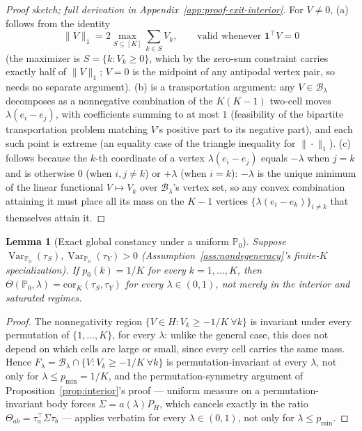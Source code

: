 \documentclass[11pt]{article}
\theoremstyle{plain}
\newtheorem{lemma}[theorem]{Lemma}
\theoremstyle{definition}
\theoremstyle{remark}
\newcommand{\PP}{\mathbb{P}}
\newcommand{\cB}{\mathcal{B}}
\newcommand{\Corr}{\mathrm{cor}}
\DeclareMathOperator{\Var}{Var}
\begin{document}
\begin{proof}[Proof sketch; full derivation in Appendix~\ref{app:proof-exit-interior}]
For $V\ne0$, (a) follows from the identity
\[
    \|V\|_1=2\max_{S\subseteq[K]}\sum_{k\in S}V_k, \qquad \text{valid whenever } \mathbf1^\top V=0
\]
(the maximizer is $S=\{k:V_k\ge0\}$, which by the zero-sum constraint carries
exactly half of $\|V\|_1$; $V=0$ is the midpoint of any antipodal vertex pair, so
needs no separate argument). (b) is a transportation argument: any $V\in\cB_\lambda$
decomposes as a nonnegative combination of the $K(K-1)$ two-cell moves
$\lambda(e_i-e_j)$, with coefficients summing to at most $1$ (feasibility of the
bipartite transportation problem matching $V$'s positive part to its negative
part), and each such point is extreme (an equality case of the triangle inequality
for $\|\cdot\|_1$). (c) follows because the $k$-th coordinate of a vertex
$\lambda(e_i-e_j)$ equals $-\lambda$ when $j=k$ and is otherwise $0$ (when
$i,j\ne k$) or $+\lambda$ (when $i=k$): $-\lambda$ is the unique minimum of the
linear functional $V\mapsto V_k$ over $\cB_\lambda$'s vertex set, so any convex
combination attaining it must place all its mass on the $K-1$ vertices
$\{\lambda(e_i-e_k)\}_{i\ne k}$ that themselves attain it.
\end{proof}

\begin{lemma}[Exact global constancy under a uniform $\PP_0$]\label{lem:uniform-global}
Suppose $\Var_{\PP_0}(\tau_S),\Var_{\PP_0}(\tau_Y)>0$
(Assumption~\ref{ass:nondegeneracy}'s finite-$K$ specialization). If
$p_0(k)=1/K$ for every $k=1,\dots,K$, then $\Theta(\PP_0,\lambda)=\Corr_K(\tau_S,\tau_Y)$
for \emph{every} $\lambda\in(0,1)$, not merely in the interior and saturated
regimes.
\end{lemma}

\begin{proof}
The nonnegativity region $\{V\in H:V_k\ge-1/K\ \forall k\}$ is invariant under every
permutation of $\{1,\dots,K\}$, for every $\lambda$: unlike the general case, this
does not depend on which cells are large or small, since every cell carries the same
mass. Hence $F_\lambda=\cB_\lambda\cap\{V:V_k\ge-1/K\ \forall k\}$ is
permutation-invariant at every $\lambda$, not only for $\lambda\le p_{\min}=1/K$, and
the permutation-symmetry argument of Proposition~\ref{prop:interior}'s proof ---
uniform measure on a permutation-invariant body forces $\Sigma=a(\lambda)P_H$, which
cancels exactly in the ratio $\Theta_{ab}=\tau_a^\top\Sigma\tau_b$ --- applies
verbatim for every $\lambda\in(0,1)$, not only for $\lambda\le p_{\min}$.
\end{proof}
\end{document}
